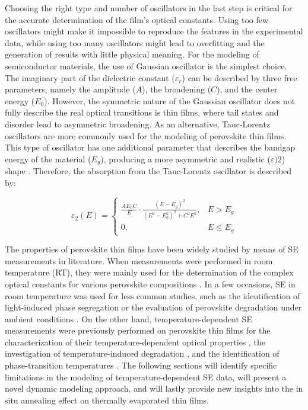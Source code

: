 Choosing the right type and number of oscillators in the last step is critical for the accurate determination of the film's optical constants. Using too few oscillators might make it impossible to reproduce the features in the experimental data, while using too many oscillators might lead to overfitting and the generation of results with little physical meaning. For the modeling of semiconductor materials, the use of Gaussian oscillator is the simplest choice. The imaginary part of the dielectric constant ($\varepsilon_r$) can be described by three free parameters, namely the amplitude ($A$), the broadening ($C$), and the center energy ($E_0$). However, the symmetric nature of the Gaussian oscillator does not fully describe the real optical transitions is thin films, where tail states and disorder lead to asymmetric broadening. As an alternative, Tauc-Lorentz oscillators are more commonly used for the modeling of perovskite thin films. This type of oscillator has one additional parameter that describes the bandgap energy of the material ($E_g$), producing a more asymmetric and realistic ($\varepsilon)2$) shape \cite{Jellison1996ParameterizationRegion}. Therefore, the absorption from the Tauc-Lorentz oscillator is described by: 

\begin{equation}
\varepsilon_2(E) =
\begin{cases}
\frac{A E_0 C}{E} \cdot \frac{(E - E_g)^2}{(E^2 - E_0^2)^2 + C^2 E^2}, & E > E_g \\
0, & E \leq E_g
\end{cases}
\label{eq:tauc_lorentz}
\end{equation}


The properties of perovskite thin films have been widely studied by means of SE measurements in literature. When measurements were performed in room temperature (RT), they were mainly used for the determination of the complex optical constants for various perovskite compositions \cite{Yan2020DeterminationFilms, Zhao2018EllipsometricFilm, Loper2015ComplexSpectrophotometry, Yuan2021Moisture-stimulatedProperties}. In a few occasions, SE in room temperature was used for less common studies, such as the identification of light-induced phase segregation \cite{Bernhardt2022InPerovskites} or the evaluation of perovskite degradation under ambient conditions \cite{Marronnier2018ElectricalConditions}. On the other hand, temperature-dependent SE measurements were previously performed on perovskite thin films for the characterization of their temperature-dependent optical properties \cite{Jiang2016TemperatureEllipsometry, Chen2019CharacterizingEllipsometry}, the investigation of temperature-induced degradation \cite{Tejada2022HybridInfrared, Wang2019InEllipsometry}, and the identification of phase-transition temperatures \cite{Yuan2020InPortfolio, Yuan2021Moisture-stimulatedProperties}. The following sections will identify specific limitations in the modeling of temperature-dependent SE data, will present a novel dynamic modeling approach, and will lastly provide new insights into the in situ annealing effect on thermally evaporated  thin films.  


